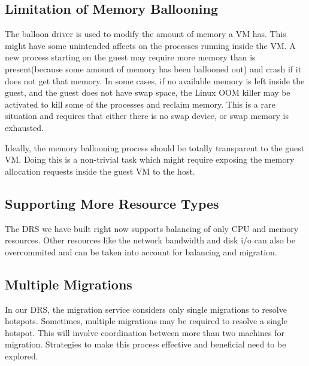\subsection{Limitation of Memory Ballooning}
The balloon driver is used to modify the amount of memory a VM has. This might have some unintended affects on the processes running inside the VM. A new process starting on the guest may require more memory than is present(because some amount of memory has been ballooned out) and crash if it does not get that memory. In some cases, if no available memory is left inside the guest, and the guest does not have swap space, the Linux OOM killer may be activated to kill some of the processes and reclaim memory. This is a rare situation and requires that either there is no swap device, or swap memory is exhausted.

Ideally, the memory ballooning process should be totally transparent to the guest VM. Doing this is a non-trivial task which might require exposing the memory allocation requests inside the guest VM to the host.

\subsection{Supporting More Resource Types}
The DRS we have built right now supports balancing of only CPU and memory resources. Other resources like the network bandwidth and disk i/o can also be overcommited and can be taken into account for balancing and migration.

\subsection{Multiple Migrations}
In our DRS, the migration service considers only single migrations to resolve hotspots. Sometimes, multiple migrations may be required to resolve a single hotspot. This will involve coordination between more than two machines for migration. Strategies to make this process effective and beneficial need to be explored.